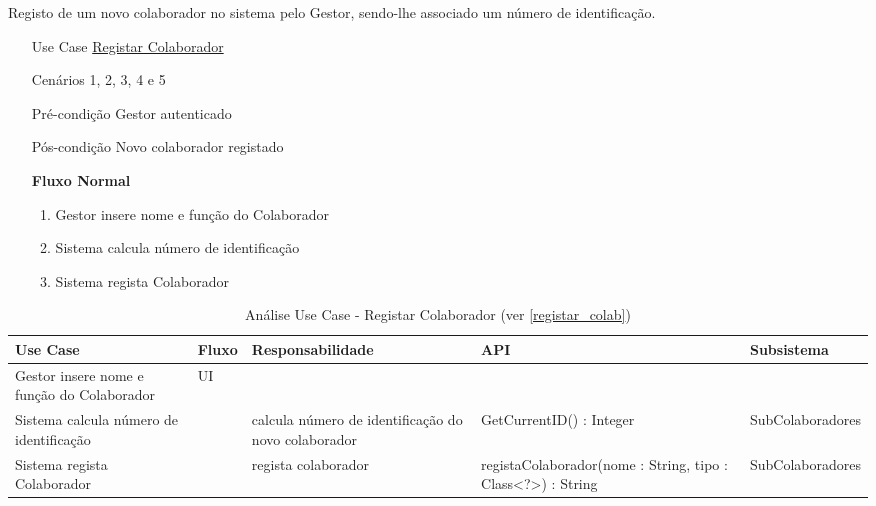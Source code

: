 \documentclass[../relatorio.tex]{subfiles}
\begin{document}
Registo de um novo colaborador no sistema pelo Gestor, sendo-lhe associado um número de identificação.
\begin{itemize}
    \item[Use Case] {\underline{Registar Colaborador}}
    \item[Cenários] {1, 2, 3, 4 e 5} 
    \item[Pré-condição] {Gestor autenticado}
    \item[Pós-condição] {Novo colaborador registado}
            \begin{flushleft}
                \textbf{Fluxo Normal}
            \end{flushleft}
            \begin{enumerate}
                \item Gestor insere nome e função do Colaborador
                \item Sistema calcula número de identificação
                \item Sistema regista Colaborador
            \end{enumerate}
\end{itemize}

\begin{landscape}
    \begin{table}[!h]
        \centering
        \begin{tabular}{|p{5cm}|p{1cm}|p{4cm}|p{6cm}|p{3cm}|}
            \hline
            \rowcolor{gray!20!white}
            Use Case & Fluxo                                            & Responsabilidade & API & Subsistema \\
            \hline
            \rowcolor{yellow}
            Gestor insere nome e função do Colaborador
                     & UI
                     & 
                     & 
                     & 
            \\
            \hline
            Sistema calcula número de identificação
                     & 
                     & calcula número de identificação do novo colaborador
                     & GetCurrentID() : Integer
                     & SubColaboradores
            \\
            \hline
            Sistema regista Colaborador
                     & 
                     & regista colaborador
                     & registaColaborador(nome : String, tipo : Class<?>) : String
                     & SubColaboradores
            \\
            \hline
        \end{tabular}
        \caption{Análise Use Case - Registar Colaborador (ver \ref{registar_colab})}
    \end{table}
\end{landscape}
\end{document}
